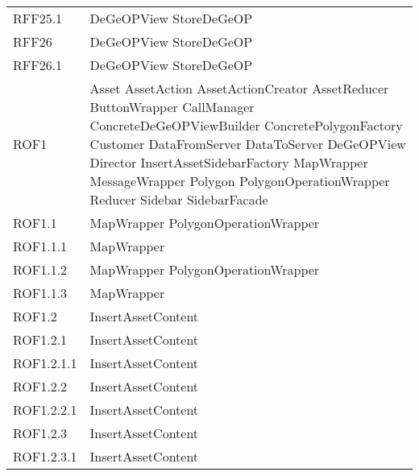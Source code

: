 \begin{longtable}{p{2.5cm}!{\VRule[1pt]}p{5cm}}
		RFF25.1 & DeGeOPView \newline StoreDeGeOP\\
		RFF26 & DeGeOPView \newline StoreDeGeOP\\
		RFF26.1 & DeGeOPView \newline StoreDeGeOP\\
		ROF1 & Asset \newline AssetAction \newline AssetActionCreator \newline AssetReducer \newline ButtonWrapper \newline CallManager \newline ConcreteDeGeOPViewBuilder \newline ConcretePolygonFactory \newline Customer \newline DataFromServer \newline DataToServer \newline DeGeOPView \newline Director \newline InsertAssetSidebarFactory \newline MapWrapper \newline MessageWrapper \newline Polygon \newline PolygonOperationWrapper \newline Reducer \newline Sidebar \newline SidebarFacade\\
		ROF1.1 & MapWrapper \newline PolygonOperationWrapper\\
		ROF1.1.1 & MapWrapper\\
		ROF1.1.2 & MapWrapper \newline PolygonOperationWrapper\\
		ROF1.1.3 & MapWrapper\\
		ROF1.2 & InsertAssetContent\\
		ROF1.2.1 & InsertAssetContent\\
		ROF1.2.1.1 & InsertAssetContent\\
		ROF1.2.2 & InsertAssetContent\\
		ROF1.2.2.1 & InsertAssetContent\\
		ROF1.2.3 & InsertAssetContent\\
		ROF1.2.3.1 & InsertAssetContent\\

\end{longtable}
